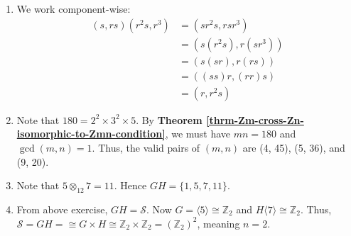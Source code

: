 \begin{enumerate}
    \item We work component-wise:
    \begin{align*}
        (s, rs)(r^2s, r^3) &= (sr^2s, rsr^3)\\
        &= (s(r^2s), r(sr^3))\\
        &= (s(sr), r(rs))\\
        &= ((ss)r, (rr)s)\\
        &= (r, r^2s)
    \end{align*}

    \item Note that $180 = 2^2 \times 3^2 \times 5$. By \textbf{Theorem \ref{thrm-Zm-cross-Zn-isomorphic-to-Zmn-condition}}, we must have $mn = 180$ and $\gcd(m, n) = 1$. Thus, the valid pairs of $(m,n)$ are (4, 45), (5, 36), and (9, 20).

    \item Note that $5 \otimes_{12} 7 = 11$. Hence $GH = \{1, 5, 7, 11\}$.

    \item From above exercise, $GH = \mathcal{S}$. Now $G = \langle 5 \rangle \cong \mathbb{Z}_2$ and $H \langle 7 \rangle \cong \mathbb{Z}_2$. Thus, $\mathcal{S} = GH = \cong G \times H \cong \mathbb{Z}_2 \times \mathbb{Z}_2 = (\mathbb{Z}_2)^2$, meaning $n = 2$.
\end{enumerate}

